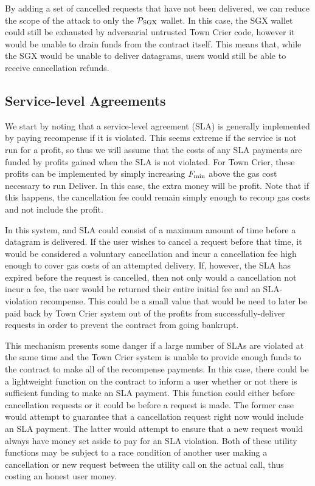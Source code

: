\documentclass[letterpaper,twocolumn,10pt]{article}
\begin{document}
By adding a set of cancelled requests that have not been delivered, we can reduce the scope of the attack to only the $\mathcal{P}_{\rm SGX}$ wallet.
In this case, the SGX wallet could still be exhausted by adversarial untrusted Town Crier code, however it would be unable to drain funds from the contract itself.
This means that, while the SGX would be unable to deliver datagrams, users would still be able to receive cancellation refunds.


\subsection{Service-level Agreements}

We start by noting that a service-level agreement (SLA) is generally implemented by paying recompense if it is violated.
This seems extreme if the service is not run for a profit, so thus we will assume that the costs of any SLA payments are funded by profits gained when the SLA is not violated.
For Town Crier, these profits can be implemented by simply increasing $F_{\rm min}$ above the gas cost necessary to run Deliver.
In this case, the extra money will be profit.
Note that if this happens, the cancellation fee could remain simply enough to recoup gas costs and not include the profit.

In this system, and SLA could consist of a maximum amount of time before a datagram is delivered.
If the user wishes to cancel a request before that time, it would be considered a voluntary cancellation and incur a cancellation fee high enough to cover gas costs of an attempted delivery.
If, however, the SLA has expired before the request is cancelled, then not only would a cancellation not incur a fee, the user would be returned their entire initial fee and an SLA-violation recompense.
This could be a small value that would be need to later be paid back by Town Crier system out of the profits from successfully-deliver requests in order to prevent the contract from going bankrupt.

This mechanism presents some danger if a large number of SLAs are violated at the same time and the Town Crier system is unable to provide enough funds to the contract to make all of the recompense payments.
In this case, there could be a lightweight function on the contract to inform a user whether or not there is sufficient funding to make an SLA payment.
This function could either before cancellation requests or it could be before a request is made.
The former case would attempt to guarantee that a cancellation request right now would include an SLA payment.
The latter would attempt to ensure that a new request would always have money set aside to pay for an SLA violation.
Both of these utility functions may be subject to a race condition of another user making a cancellation or new request between the utility call on the actual call, thus costing an honest user money.
\end{document}
